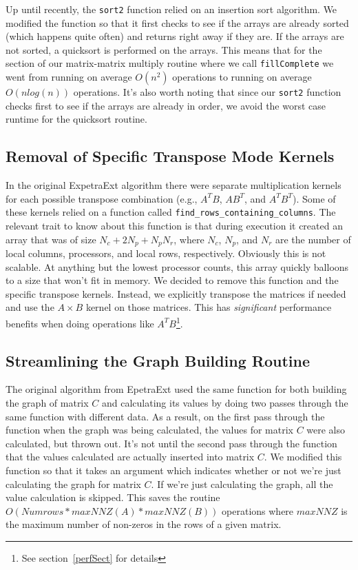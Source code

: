\documentclass[pdf,12pt]{SANDreport}
\begin{document}
Up until recently, the \verb!sort2! function relied on an insertion sort algorithm. We modified the function so that it 
first checks to see if the arrays are already sorted (which happens quite often) and returns right away if they are. 
If the arrays are not sorted, a quicksort is performed on the arrays. This means that for the section of our matrix-matrix
multiply routine where we call \verb!fillComplete! we went from running on average $O(n^2)$ operations to running on average
$O(nlog(n))$ operations.
It's also worth noting that since our \verb!sort2! function checks first to see if the arrays are already in order, we 
avoid the worst case runtime for the quicksort routine.

\subsection{Removal of Specific Transpose Mode Kernels}
In the original ExpetraExt algorithm there were separate multiplication kernels for each possible transpose combination 
(e.g., $A^TB$, $AB^T$, and $A^TB^T$).
Some of these kernels relied on a function called \verb!find_rows_containing_columns!. The relevant trait to know about this 
function is that during execution it created an array that was of size 
$N_c+ 2N_p + N_p N_r$, where
$N_c$, $N_p$, and $N_r$ are the number of local columns, processors, and local rows, respectively.
Obviously this is not scalable. At anything but the lowest processor counts, this array quickly balloons to a size that 
won't fit in memory. We decided to remove this function and the specific transpose kernels. Instead, we explicitly 
transpose the matrices if needed
and use the $A \times B$ kernel on those matrices. This has \emph{significant} performance benefits when doing operations like $A^TB$\footnote{See section~\ref{perfSect} for details}.

\subsection{Streamlining the Graph Building Routine}
The original algorithm from EpetraExt used the same function for both building the graph of matrix $C$ and calculating its 
values by doing two passes through the same function with different data. 
As a result, on the first pass through the function when the graph was being calculated, the values for matrix $C$ were also 
calculated, but thrown out. It's not until the second pass through the function 
that the values calculated are actually inserted into matrix $C$. We modified this function so that it
takes an argument which indicates whether or not we're just calculating the graph for matrix $C$. If we're just calculating 
the graph, all the value calculation is skipped. This saves the routine $O(Numrows*maxNNZ(A)*maxNNZ(B))$ operations 
where $maxNNZ$ is the maximum number of non-zeros in the rows of a given matrix.
\end{document}
